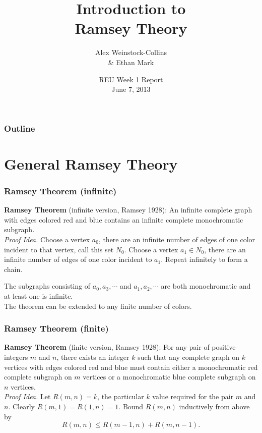 \documentclass[pdf,hyperref={urlbordercolor={0 1 1}},xcolor=pdftex,dvipsnames]{beamer}
\title[Introduction to Ramsey Theory]
{Introduction to \\Ramsey Theory}
\author[Alex Weinstock-Collins \& Ethan Mark]
  {{Alex Weinstock-Collins\\\vspace{.1cm} \& Ethan Mark}\\
}
\date{
  REU Week 1 Report\\ \vspace{.25cm}
  June 7, 2013
}
\begin{document}
\begin{frame}
  \titlepage
\end{frame}

\begin{frame}
  \frametitle{Outline}
  \tableofcontents
\end{frame}


\section{General Ramsey Theory}

\begin{frame}
  \frametitle{Ramsey Theorem (infinite)}
  \textbf{Ramsey Theorem} (infinite version, Ramsey 1928): An infinite complete graph with 
    edges colored red and blue contains an infinite complete monochromatic subgraph.\\\vspace{.25cm}
  \textit{Proof Idea.} Choose a vertex $a_0$, there are an infinite number of edges of one 
    color incident to that vertex, call this set $N_0$. Choose a vertex $a_1\in N_0$, there 
    are an infinite number of edges of one color incident to $a_1$. Repeat infinitely to form
    a chain.
  \begin{center}\begin{tikzpicture}
    
  \end{tikzpicture}\end{center}
  The subgraphs consisting of $a_0, a_3, \cdots$ and $a_1, a_2, \cdots$ are both
  monochromatic and at least one is infinite.\\\vspace{.25cm}
  The theorem can be extended to any finite number of colors.
\end{frame}

\begin{frame}
  \frametitle{Ramsey Theorem (finite)}
  \textbf{Ramsey Theorem} (finite version, Ramsey 1928): For any pair of positive integers $m$ and $n$,
    there exists an integer $k$ such that any complete graph on $k$ vertices with edges
    colored red and blue must contain either a monochromatic red complete subgraph on $m$
    vertices or a monochromatic blue complete subgraph on $n$ vertices.\\\vspace{.25cm}
  \textit{Proof Idea.} Let $R(m,n)=k$, the particular $k$ value required for the pair $m$ and
    $n$. Clearly $R(m,1)=R(1,n)=1$. Bound $R(m,n)$ inductively from above by
  $$R(m,n)\le R(m-1,n) + R(m,n-1).$$
\end{frame}
\end{document}
